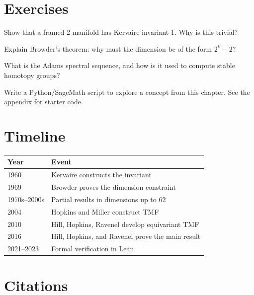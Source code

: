 \section{Exercises}

\begin{exercise}[Basic]
Show that a framed 2-manifold has Kervaire invariant 1. Why is this trivial?
\end{exercise}

\begin{exercise}[Intermediate]
Explain Browder's theorem: why must the dimension be of the form $2^k - 2$?
\end{exercise}

\begin{exercise}[Challenge]
What is the Adams spectral sequence, and how is it used to compute stable homotopy groups?
\end{exercise}


\begin{exercise}[Computational]
Write a Python/SageMath script to explore a concept from this chapter. See the appendix for starter code.
\end{exercise}

\section{Timeline}

\begin{tabularx}{\linewidth}{lX}
\toprule
\textbf{Year} & \textbf{Event} \\ \midrule
1960 & Kervaire constructs the invariant \cite{kervaire1960} \\ 
1969 & Browder proves the dimension constraint \cite{browder1969} \\ 
1970s--2000s & Partial results in dimensions up to 62 \\ 
2004 & Hopkins and Miller construct TMF \cite{hopkins2004} \\ 
2010 & Hill, Hopkins, Ravenel develop equivariant TMF \cite{hill2010} \\ 
2016 & Hill, Hopkins, and Ravenel prove the main result \cite{hill2016} \\ 
2021--2023 & Formal verification in Lean \\ \bottomrule
\end{tabularx}

\section{Citations}

